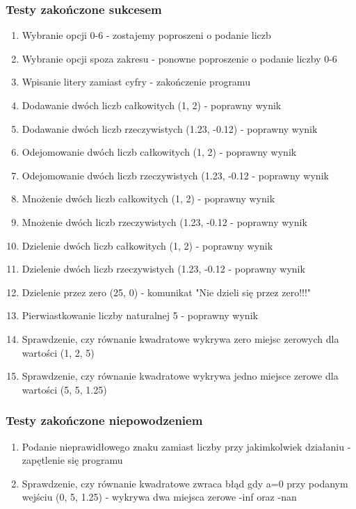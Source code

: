 \documentclass{article}
\begin{document}
\subsubsection{Testy zakończone sukcesem}
\begin{enumerate}
\item Wybranie opcji 0-6 - zostajemy poproszeni o podanie liczb
\item Wybranie opcji spoza zakresu - ponowne poproszenie o podanie liczby 0-6
\item Wpisanie litery zamiast cyfry - zakończenie programu
\item Dodawanie dwóch liczb całkowitych (1, 2) - poprawny wynik
\item Dodawanie dwóch liczb rzeczywistych (1.23, -0.12) - poprawny wynik
\item Odejomowanie dwóch liczb całkowitych (1, 2) - poprawny wynik
\item Odejomowanie dwóch liczb rzeczywistych (1.23, -0.12 - poprawny wynik
\item Mnożenie dwóch liczb całkowitych (1, 2) - poprawny wynik
\item Mnożenie dwóch liczb rzeczywistych (1.23, -0.12 - poprawny wynik
\item Dzielenie dwóch liczb całkowitych (1, 2) - poprawny wynik
\item Dzielenie dwóch liczb rzeczywistych (1.23, -0.12 - poprawny wynik
\item Dzielenie przez zero (25, 0) - komunikat "Nie dzieli się przez zero!!!"
\item Pierwiastkowanie liczby naturalnej 5 - poprawny wynik
\item Sprawdzenie, czy równanie kwadratowe wykrywa zero miejsc zerowych dla wartości (1, 2, 5)
\item Sprawdzenie, czy równanie kwadratowe wykrywa jedno miejsce zerowe dla wartości (5, 5, 1.25)
\end{enumerate}
\subsubsection{Testy zakończone niepowodzeniem}
\begin{enumerate}

\item Podanie nieprawidłowego znaku  zamiast liczby przy jakimkolwiek działaniu - zapętlenie się programu
\item Sprawdzenie, czy równanie kwadratowe zwraca błąd gdy a=0 przy podanym wejściu (0, 5, 1.25) - wykrywa dwa miejsca zerowe -inf oraz -nan  

\end{enumerate}
\end{document}
